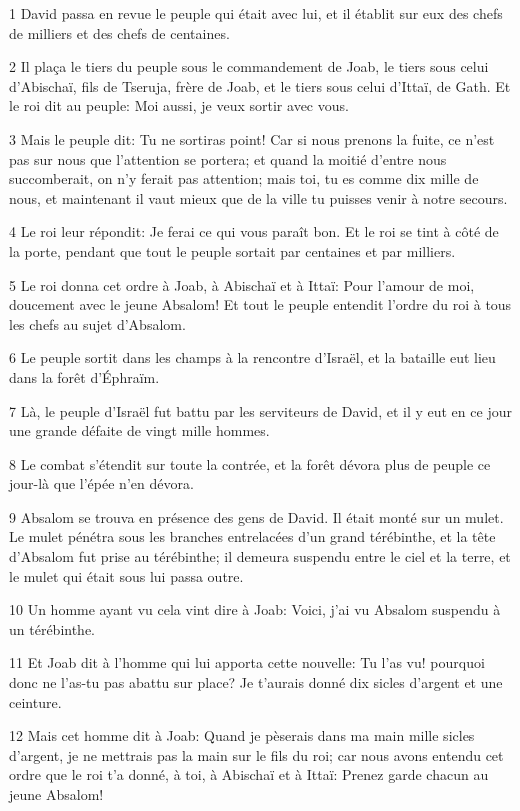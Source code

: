 \par 1 David passa en revue le peuple qui était avec lui, et il établit sur eux des chefs de milliers et des chefs de centaines.
\par 2 Il plaça le tiers du peuple sous le commandement de Joab, le tiers sous celui d'Abischaï, fils de Tseruja, frère de Joab, et le tiers sous celui d'Ittaï, de Gath. Et le roi dit au peuple: Moi aussi, je veux sortir avec vous.
\par 3 Mais le peuple dit: Tu ne sortiras point! Car si nous prenons la fuite, ce n'est pas sur nous que l'attention se portera; et quand la moitié d'entre nous succomberait, on n'y ferait pas attention; mais toi, tu es comme dix mille de nous, et maintenant il vaut mieux que de la ville tu puisses venir à notre secours.
\par 4 Le roi leur répondit: Je ferai ce qui vous paraît bon. Et le roi se tint à côté de la porte, pendant que tout le peuple sortait par centaines et par milliers.
\par 5 Le roi donna cet ordre à Joab, à Abischaï et à Ittaï: Pour l'amour de moi, doucement avec le jeune Absalom! Et tout le peuple entendit l'ordre du roi à tous les chefs au sujet d'Absalom.
\par 6 Le peuple sortit dans les champs à la rencontre d'Israël, et la bataille eut lieu dans la forêt d'Éphraïm.
\par 7 Là, le peuple d'Israël fut battu par les serviteurs de David, et il y eut en ce jour une grande défaite de vingt mille hommes.
\par 8 Le combat s'étendit sur toute la contrée, et la forêt dévora plus de peuple ce jour-là que l'épée n'en dévora.
\par 9 Absalom se trouva en présence des gens de David. Il était monté sur un mulet. Le mulet pénétra sous les branches entrelacées d'un grand térébinthe, et la tête d'Absalom fut prise au térébinthe; il demeura suspendu entre le ciel et la terre, et le mulet qui était sous lui passa outre.
\par 10 Un homme ayant vu cela vint dire à Joab: Voici, j'ai vu Absalom suspendu à un térébinthe.
\par 11 Et Joab dit à l'homme qui lui apporta cette nouvelle: Tu l'as vu! pourquoi donc ne l'as-tu pas abattu sur place? Je t'aurais donné dix sicles d'argent et une ceinture.
\par 12 Mais cet homme dit à Joab: Quand je pèserais dans ma main mille sicles d'argent, je ne mettrais pas la main sur le fils du roi; car nous avons entendu cet ordre que le roi t'a donné, à toi, à Abischaï et à Ittaï: Prenez garde chacun au jeune Absalom!
